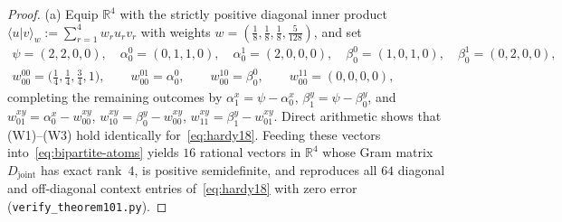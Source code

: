 \documentclass[11pt,a4paper]{article}
\theoremstyle{definition}
\theoremstyle{remark}
\newcommand{\braket}[2]{\langle #1 | #2 \rangle}
\begin{document}
\begin{proof}
(a) Equip $\mathbb{R}^4$ with the strictly positive diagonal inner product $\braket{u}{v}_w := \sum_{r=1}^4 w_r u_r v_r$ with weights $w = (\tfrac{1}{8}, \tfrac{1}{8}, \tfrac{1}{8}, \tfrac{5}{128})$, and set
\begin{gather*}
\psi = (2,2,0,0), \quad \alpha^0_0 = (0,1,1,0), \quad \alpha^1_0 = (2,0,0,0), \quad \beta^0_0 = (1,0,1,0), \quad \beta^1_0 = (0,2,0,0), \\
w^{00}_{00} = \bigl(\tfrac{1}{4},\tfrac{1}{4},\tfrac{3}{4},1\bigr), \qquad w^{01}_{00} = \alpha^0_0, \qquad w^{10}_{00} = \beta^0_0, \qquad w^{11}_{00} = (0,0,0,0),
\end{gather*}
completing the remaining outcomes by $\alpha^x_1 = \psi - \alpha^x_0$, $\beta^y_1 = \psi - \beta^y_0$, and $w^{xy}_{01} = \alpha^x_0 - w^{xy}_{00}$, $w^{xy}_{10} = \beta^y_0 - w^{xy}_{00}$, $w^{xy}_{11} = \beta^y_1 - w^{xy}_{01}$. Direct arithmetic shows that (W1)--(W3) hold identically for~\eqref{eq:hardy18}. Feeding these vectors into~\eqref{eq:bipartite-atoms} yields $16$ rational vectors in $\mathbb{R}^4$ whose Gram matrix $D_{\mathrm{joint}}$ has exact rank~$4$, is positive semidefinite, and reproduces all $64$ diagonal and off-diagonal context entries of~\eqref{eq:hardy18} with zero error (\texttt{verify\_theorem101.py}).


\end{proof}
\end{document}
